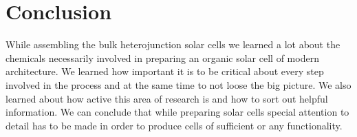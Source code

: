 
\section{Conclusion}\label{sec:conclusion}

While assembling the bulk heterojunction solar cells we learned a lot about the chemicals necessarily involved in preparing an organic solar cell of modern architecture. We learned how important it is to be critical about every step involved in the process and at the same time to not loose the big picture. We also learned about how active this area of research is and how to sort out helpful information. \mypar
We can conclude that while preparing solar cells special attention to detail has to be made in order to produce cells of sufficient or any functionality.



